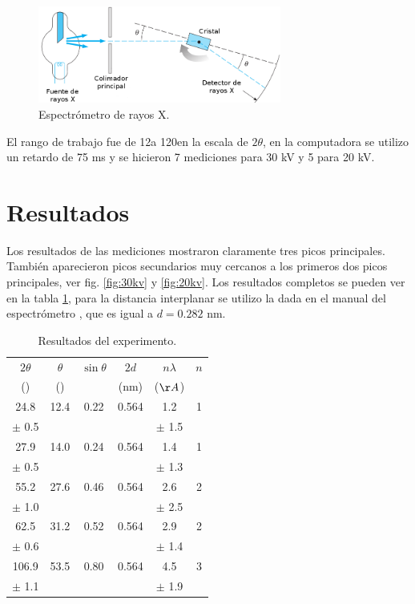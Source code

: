 \documentclass[letterpaper,10pt,twocolumn]{article}
\numberwithin{equation}{section}
\newcommand{\grado}{\textdegree}%
\begin{document}
\begin{figure}[H]
  \centering
  \includegraphics[width=8cm]{espectrometro}
  \caption{Espectrómetro de rayos X.\cite{serway}}
  \label{espectrometro}
\end{figure}

El rango de trabajo fue de 12\grado a 120\grado en la escala de $2\theta$, en la computadora
se utilizo un retardo de 75 ms y se hicieron 7 mediciones para 30 kV y 5 para 20 kV. 

\section{Resultados}
\label{sec:resultados}

Los resultados de las mediciones mostraron claramente tres picos principales. También
aparecieron picos secundarios muy cercanos a los primeros dos picos principales, ver
fig. \ref{fig:30kv} y \ref{fig:20kv}. Los resultados completos se pueden ver en la tabla
\ref{tab:resultados}, para la distancia interplanar se utilizo la dada en el manual del
espectrómetro \cite{teletron}, que es igual a $d = 0.282$ nm.

\begin{table}[H] 
\centering
{}
\begin{tabular}{|c|c|c|c|c|c|} 
\hline 
\rowcolor{LightBlue2} $2\theta$ & $\theta$ & $\sin\theta$ & $2d$ & $n\lambda$ & $n$ \\  
\rowcolor{LightBlue2} (\grado) & (\grado) &  & (nm) & ($\AA$) &  \\  
\hline 
24.8 & 12.4 & 0.22 & 0.564 & 1.2 & 1 \\ 
 $\pm$ 0.5 & & & & $\pm$ 1.5 & \\ 
\hline 
27.9 & 14.0 & 0.24 & 0.564 & 1.4 & 1 \\ 
 $\pm$ 0.5 & & & &  $\pm$ 1.3 & \\ 
\hline 
55.2 & 27.6 & 0.46 & 0.564 & 2.6 &  2 \\ 
 $\pm$ 1.0 & & & & $\pm$ 2.5 & \\ 
\hline 
62.5 & 31.2 & 0.52 & 0.564 & 2.9 & 2 \\ 
 $\pm$ 0.6 & & & & $\pm$ 1.4 & \\ 
\hline 
106.9 & 53.5 & 0.80 & 0.564 & 4.5 & 3 \\ 
 $\pm$ 1.1 & & & & $\pm$ 1.9 & \\ 
\hline 
\end{tabular} 
\caption{Resultados del experimento.} 
\label{tab:resultados}
\end{table} 
\end{document}
